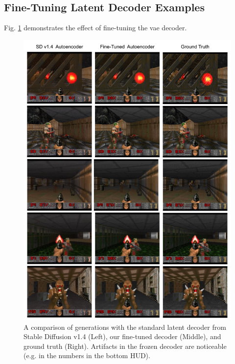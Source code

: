 \documentclass{article} %
\begin{document}
\subsection{Fine-Tuning Latent Decoder Examples}
\label{appendix:fine-tune-vae}
Fig. \ref{fig:vae-ft-ablation} demonstrates the effect of fine-tuning the vae decoder.
\begin{figure}[h]
    \centering
    \vspace{-0.1in}
    \includegraphics[width=\textwidth]{figures/fine_tuning_autoencoder.png}
    \caption{A comparison of generations with the standard latent decoder from Stable Diffusion v1.4 (Left), our fine-tuned decoder (Middle), and ground truth (Right). Artifacts in the frozen decoder are noticeable (e.g. in the numbers in the bottom HUD).}
    \label{fig:vae-ft-ablation}
    \vspace{-0.05in}
\end{figure}


\clearpage
\end{document}
